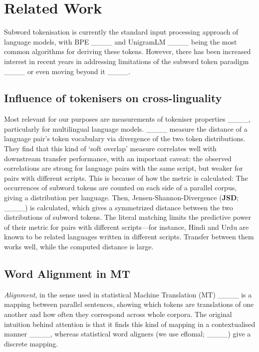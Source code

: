 \section{Related Work}
Subword tokenisation is currently the standard input processing approach of language models, with BPE ____ and UnigramLM ____ being the most common algorithms for deriving these tokens.
However, there has been increased interest in recent years in addressing limitations of the subword token paradigm ____
or even moving beyond it ____.

\subsection{Influence of tokenisers on cross-linguality}\label{subsec:related-tokenisation}

Most relevant for our purposes are measurements of tokeniser properties
____, particularly for multilingual language models.
____ measure the distance of a language pair's token vocabulary via
divergence of the two token distributions.
They find that this kind of `soft overlap' measure correlates well with downstream transfer performance, with an important caveat: the observed correlations are strong for language pairs with the same script, but weaker for pairs with different scripts.
%
This is because of how the metric is calculated:
The occurrences of subword tokens are counted on each side of a parallel corpus, giving a distribution per language.
Then, Jensen-Shannon-Divergence (\textbf{JSD}; ____) is calculated, which gives a symmetrized distance between the two distributions of subword tokens.
The literal matching limits the predictive power of their metric for pairs with different scripts---for instance, Hindi and Urdu are known to be related languages written in different scripts.
Transfer between them works well, while the computed distance is large.


\subsection{Word Alignment in MT}

\textit{Alignment}, in the sense used in statistical Machine Translation (MT) ____ is
a mapping between parallel sentences, showing which tokens are translations of one another and how often they correspond across whole corpora.
The original intuition behind attention is that it finds this kind of mapping in a contextualised manner ____,
whereas statistical word aligners
(we use eflomal; ____) give a discrete mapping.